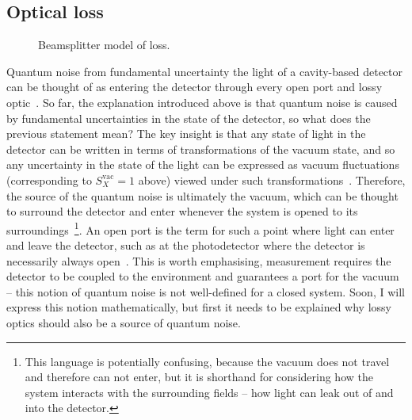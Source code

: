 \subsection{Optical loss}

\begin{figure}
	\centering
	\caption{Beamsplitter model of loss.}
	\label{fig:beamsplitter_loss}
\end{figure}

Quantum noise from fundamental uncertainty the light of a cavity-based detector can be thought of as entering the detector through every open port and lossy optic~\cite{}. So far, the explanation introduced above is that quantum noise is caused by fundamental uncertainties in the state of the detector, so what does the previous statement mean? %
The key insight is that any state of light in the detector can be written in terms of transformations of the vacuum state, and so any uncertainty in the state of the light can be expressed as vacuum fluctuations (corresponding to $S_X^\text{vac}=1$ above) viewed under such transformations~\cite{}. Therefore, the source of the quantum noise is ultimately the vacuum, which can be thought to surround the detector and enter whenever the system is opened to its surroundings~\footnote{This language is potentially confusing, because the vacuum does not travel and therefore can not enter, but it is shorthand for considering how the system interacts with the surrounding fields -- how light can leak out of and into the detector.}. An open port is the term for such a point where light can enter and leave the detector, such as at the photodetector where the detector is necessarily always open~\cite{}. This is worth emphasising, measurement requires the detector to be coupled to the environment and guarantees a port for the vacuum -- this notion of quantum noise is not well-defined for a closed system. Soon, I will express this notion mathematically, but first it needs to be explained why lossy optics should also be a source of quantum noise.

